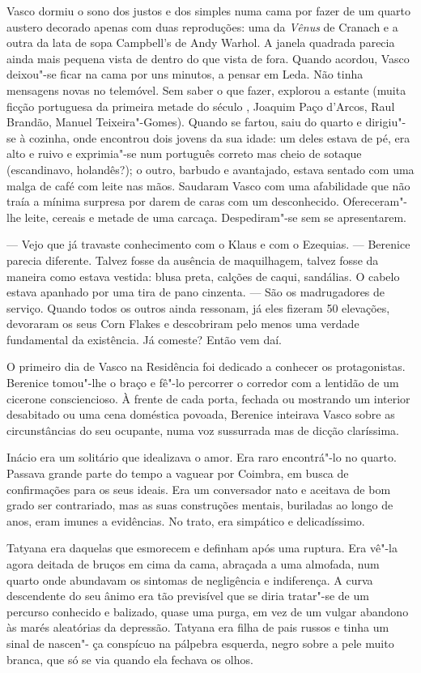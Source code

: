 Vasco dormiu o sono dos justos e dos simples numa cama por fazer de um
quarto austero decorado apenas com duas reproduções: uma da
\emph{Vênus }de Cranach e a outra da lata de sopa Campbell's de Andy
Warhol. A janela quadrada parecia ainda mais pequena vista de dentro do
que vista de fora. Quando acordou, Vasco deixou"-se ficar na cama por uns
minutos, a pensar em Leda. Não tinha mensagens novas no telemóvel.
Sem saber o que fazer, explorou a estante (muita ficção portuguesa da
primeira metade do século , Joaquim Paço d'Arcos, Raul Brandão, Manuel
Teixeira"-Gomes). Quando se fartou, saiu do quarto e dirigiu"-se à
cozinha, onde encontrou dois jovens da sua idade: um deles estava de pé,
era alto e ruivo e exprimia"-se num português correto mas cheio de
sotaque (escandinavo, holandês?); o outro, barbudo e avantajado, estava
sentado com uma malga de café com leite nas mãos. Saudaram Vasco com uma
afabilidade que não traía a mínima surpresa por darem de caras com um
desconhecido. Ofereceram"-lhe leite, cereais e metade de uma carcaça.
Despediram"-se sem se apresentarem.

--- Vejo que já travaste conhecimento com o Klaus e com o Ezequias. ---
  Berenice parecia diferente. Talvez fosse da ausência de maquilhagem,
  talvez fosse da maneira como estava vestida: blusa preta, calções de
  caqui, sandálias. O cabelo estava apanhado por uma tira de pano
  cinzenta. --- São os madrugadores de serviço. Quando todos os outros
  ainda ressonam, já eles fizeram 50 elevações, devoraram os seus Corn
  Flakes e descobriram pelo menos uma verdade fundamental da existência.
  Já comeste? Então vem daí.

O primeiro dia de Vasco na Residência foi dedicado a conhecer os
protagonistas. Berenice tomou"-lhe o braço e fê"-lo percorrer o corredor com a lentidão de um cicerone consciencioso.
À frente de cada porta, fechada ou mostrando um interior desabitado ou
uma cena doméstica povoada, Berenice inteirava Vasco sobre as
circunstâncias do seu ocupante, numa voz sussurrada mas de dicção
claríssima.

Inácio era um solitário que idealizava o amor. Era raro encontrá"-lo no
quarto. Passava grande parte do tempo a vaguear por Coimbra, em busca de
confirmações para os seus ideais.
Era um conversador nato e aceitava de bom grado ser contrariado, mas
as suas construções mentais, buriladas ao longo de anos, eram imunes a
evidências. No trato, era simpático e delicadíssimo.

Tatyana era daquelas que esmorecem e definham após uma ruptura. Era
vê"-la agora deitada de bruços em cima da cama, abraçada a uma almofada,
num quarto onde abundavam os sintomas de negligência e indiferença. A
curva descendente do seu ânimo era tão previsível que se diria
tratar"-se de um percurso conhecido e balizado, quase uma purga, em vez
de um vulgar abandono às marés aleatórias da depressão. Tatyana era
filha de pais russos e tinha um sinal de nascen"- ça conspícuo na
pálpebra esquerda, negro sobre a pele muito branca, que só se via quando
ela fechava os olhos.

